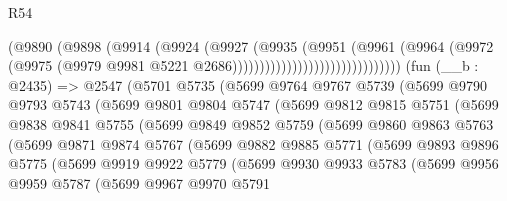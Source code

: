 \begin{lexlean}{R54}
\begin{coremodule}
                                          (@9890
                                            (@9898
                                              (@9914
                                                (@9924
                                                  (@9927
                                                    (@9935
                                                      (@9951
                                                        (@9961
                                                          (@9964
                                                            (@9972
                                                              (@9975
                                                                (@9979
                                                                  @9981
                                                                  @5221
                                                                  @2686)))))))))))))))))))))))))))))))
    (fun (__b : @2435) =>
    @2547
      (@5701
        @5735
        (@5699
          @9764
          @9767
          @5739
          (@5699
            @9790
            @9793
            @5743
            (@5699
              @9801
              @9804
              @5747
              (@5699
                @9812
                @9815
                @5751
                (@5699
                  @9838
                  @9841
                  @5755
                  (@5699
                    @9849
                    @9852
                    @5759
                    (@5699
                      @9860
                      @9863
                      @5763
                      (@5699
                        @9871
                        @9874
                        @5767
                        (@5699
                          @9882
                          @9885
                          @5771
                          (@5699
                            @9893
                            @9896
                            @5775
                            (@5699
                              @9919
                              @9922
                              @5779
                              (@5699
                                @9930
                                @9933
                                @5783
                                (@5699
                                  @9956
                                  @9959
                                  @5787
                                  (@5699
                                    @9967
                                    @9970
                                    @5791

\end{coremodule}
\end{lexlean}

